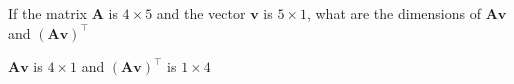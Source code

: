 If the matrix $\boldsymbol{A}$ is $4 \times 5$ and the vector $\boldsymbol{v}$ is $5 \times 1$, what are the dimensions of $\boldsymbol{Av}$ and $(\boldsymbol{Av})^\intercal$

\begin{solution}
$\boldsymbol{Av}$ is $4 \times 1$ and $(\boldsymbol{Av})^\intercal$ is $1 \times 4$
\end{solution}